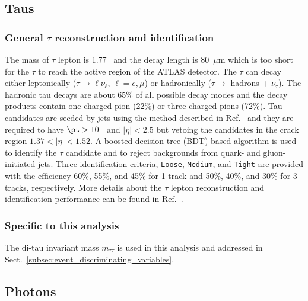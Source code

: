 
\subsection{Taus}
\label{subsec:event_Taus}


\subsubsection{General $\tau$ reconstruction and identification}
\label{subsubsec:event_taus_general}
The mass of $\tau$ lepton is 1.77~{\GeV} and the decay length is 80~$\mu$m which is too short for the $\tau$ to reach the active region of the ATLAS detector.
The $\tau$ can decay either leptonically ($\tau \to \ell \nu_{\ell}$, $\ell = e, \mu$) or hadronically ($\tau \to$ hadrons + $\nu_{\tau}$).
The hadronic tau decays are about 65\% of all possible decay modes and the decay products contain one charged pion (22\%) or three charged pions (72\%).
Tau candidates are seeded by jets using the method described in Ref.~\cite{ATLAS:2017mpa} and they are required to have $\pt > 10$~{\GeV} and $|\eta| < 2.5$ but vetoing the candidates in the crack region $1.37 < |\eta| < 1.52$.
A boosted decision tree (BDT) based algorithm is used to identify the $\tau$ candidate and to reject backgrounds from quark- and gluon-initiated jets.
Three identification criteria, \texttt{Loose}, \texttt{Medium}, and \texttt{Tight} are provided with the efficiency 60\%, 55\%, and 45\% for 1-track and 50\%, 40\%, and 30\% for 3-tracks, respectively.
More details about the $\tau$ lepton reconstruction and identification performance can be found in Ref.~\cite{ATLAS:2017mpa}.


\subsubsection{Specific to this analysis}
\label{subsubsec:event_taus_specific}
The di-tau invariant mass $m_{\tau\tau}$ is used in this analysis and addressed in Sect.~\ref{subsec:event_discriminating_variables}.


\subsection{Photons}
\label{subsec:event_photons}


